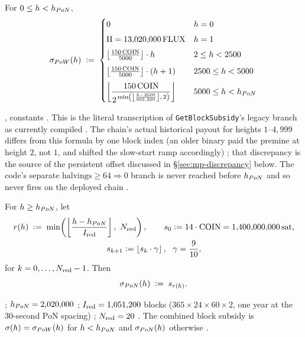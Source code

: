 \begin{definition}
\label{def:pow-subsidy}
For $0 \le h < h_{PoN}$,
$$
\sigma_{PoW}(h) \;\vcentcolon=\;
\begin{cases}
0 & h = 0 \\[4pt]
\Pi = 13{,}020{,}000\,\mathrm{FLUX} & h = 1 \\[4pt]
\left\lfloor \frac{150\,\mathrm{COIN}}{5000} \right\rfloor\cdot h & 2 \le h < 2500 \\[6pt]
\left\lfloor \frac{150\,\mathrm{COIN}}{5000} \right\rfloor\cdot (h+1) & 2500 \le h < 5000 \\[6pt]
\left\lfloor \dfrac{150\,\mathrm{COIN}}{2^{\,\min\left(\left\lfloor \frac{h-2500}{655{,}350} \right\rfloor,\,2\right)}} \right\rfloor & 5000 \le h < h_{PoN}
\end{cases}
$$
\end{definition}
\shipped {}, constants .
This is the literal transcription of \texttt{Get\allowbreak{}Block\allowbreak{}Subsidy}'s legacy branch as currently compiled
\shipped {}. The chain's actual historical
payout for heights $1$--$4{,}999$ differs from this formula by one block index (an older binary
paid the premine at height $2$, not $1$, and shifted the slow-start ramp accordingly)
\shipped {}; that discrepancy is the source
of the persistent offset discussed in \S\ref{sec:mp-discrepancy} below. The code's separate
$\text{halvings}\ge 64 \Rightarrow 0$ branch is never reached before $h_{PoN}$ and so never fires on
the deployed chain \shipped {}.

\begin{definition}
\label{def:pon-subsidy}
For $h \ge h_{PoN}$, let
\begin{gather*}
r(\hgt) \;\defeq\; \min\!\left(\floorfrac{\hgt-\hpon}{\redint},\ \redmax\right),
\qquad
s_0 \defeq 14\cdot\mathrm{COIN} = 1{,}400{,}000{,}000\sat, \\
s_{k+1} \defeq \left\lfloor s_k \cdot \redfac \right\rfloor,\ \ \redfac = \frac{9}{10},
\end{gather*}
for $k = 0,\dots,N_{\mathrm{red}}-1$. Then
$$
\sigma_{PoN}(h) \;\vcentcolon=\; s_{r(h)}.
$$
\end{definition}
\shipped {}; $h_{PoN} = 2{,}020{,}000$
\shipped {}; $I_{\mathrm{red}} = 1{,}051{,}200$ blocks
($365\times24\times60\times2$, one year at the 30-second PoN spacing)
\shipped {}; $N_{\mathrm{red}} = 20$
\shipped {}. The combined block subsidy is
$\sigma(h) = \sigma_{PoW}(h)$ for $h < h_{PoN}$ and $\sigma_{PoN}(h)$ otherwise
\shipped {}.


